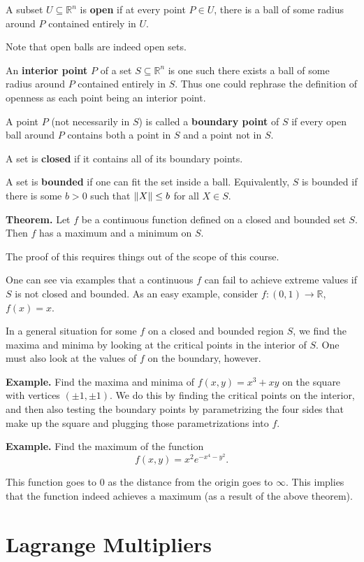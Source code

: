 \documentclass{article}
\begin{document}
A subset $U \subseteq \mathbb{R}^n$ is \textbf{open} if at every point $P \in U$, there is a ball of some radius around $P$
contained entirely in $U$.

Note that open balls are indeed open sets.

An \textbf{interior point} $P$ of a set $S \subseteq \mathbb{R}^n$ is one such there exists a ball
of some radius around $P$ contained entirely in $S$. Thus one could rephrase the definition of openness
as each point being an interior point.

A point $P$ (not necessarily in $S$) is called a \textbf{boundary point} of $S$ if every open ball around 
$P$ contains both a point in $S$ and a point not in $S$.

A set is \textbf{closed} if it contains all of its boundary points.

A set is \textbf{bounded} if one can fit the set inside a ball. Equivalently, $S$ is bounded
if there is some $b>0$ such that $\norm{X} \leq b$ for all $X\in S$.

\textbf{Theorem.} Let $f$ be a continuous function defined on a closed and bounded set $S$. Then $f$
has a maximum and a minimum on $S$. 

The proof of this requires things out of the scope of this course.

One can see via examples that a continuous $f$ can fail to achieve extreme values if $S$ is not closed and bounded.
As an easy example, consider $f:(0,1)\to \mathbb{R}$, $f(x)=x$. 

In a general situation for some $f$ on a closed and bounded region $S$, we find the maxima and minima
by looking at the critical points in the interior of $S$. One must also look at the values of $f$ on the boundary,
however.

\textbf{Example.} Find the maxima and minima of $f(x,y) = x^3 + xy$ on the square with vertices
$(\pm 1, \pm 1)$. We do this by finding the critical points on the interior, and then also testing
the boundary points by parametrizing the four sides that make up the square and plugging those
parametrizations into $f$.

\textbf{Example.} Find the maximum of the function
\[f(x,y) = x^2 e^{-x^4-y^2}.\]

This function goes to $0$ as the distance from the origin goes
to $\infty$. This implies that the function indeed achieves a
maximum (as a result of the above theorem).

\section*{Lagrange Multipliers}
\end{document}
